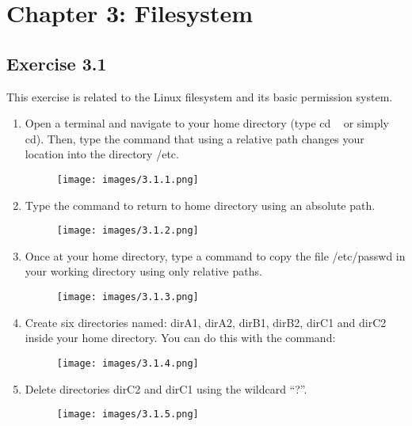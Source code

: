 \documentclass[12pt, titlepage,]{article}
\begin{document}
\section{Chapter 3: Filesystem}
\subsection{Exercise 3.1} 
This exercise is related to the Linux filesystem and its basic permission system. 
\begin{enumerate}

\item  Open a terminal and navigate to your home directory (type cd ~ or simply cd). Then, type the command that using a relative path changes your location into the directory /etc. 
\begin{figure}[h] %
    \centering
    \texttt{[image: images/3.1.1.png]}
\end{figure}

 \item  Type the command to return to home directory using an absolute path. 
\begin{figure}[h] %
    \centering
    \texttt{[image: images/3.1.2.png]}
\end{figure}
\clearpage

 \item  Once at your home directory, type a command to copy the file /etc/passwd in your working directory using only relative paths. 
\begin{figure}[h] %
    \centering
    \texttt{[image: images/3.1.3.png]}
\end{figure}
 
\item  Create six directories named: dirA1, dirA2, dirB1, dirB2, dirC1 and dirC2 inside your home directory. You can do this with the command:
\begin{figure}[h] %
    \centering
    \texttt{[image: images/3.1.4.png]}
\end{figure}

\item  Delete directories dirC2 and dirC1 using the wildcard “?”.
\begin{figure}[h] %
    \centering
    \texttt{[image: images/3.1.5.png]}
\end{figure}


\end{enumerate}
\end{document}
